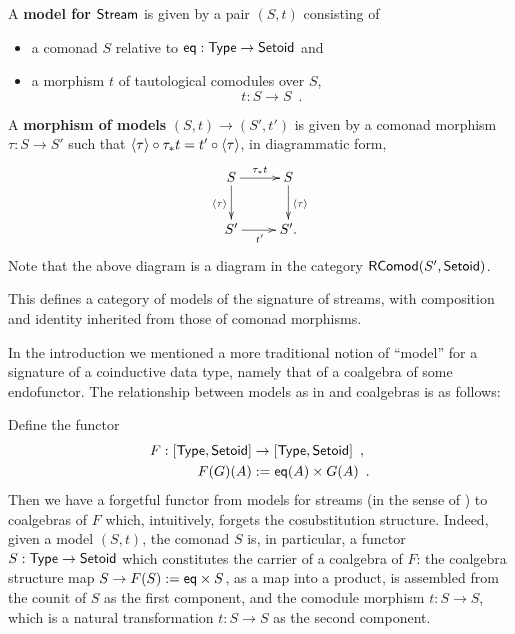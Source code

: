 \documentclass[a4paper,USenglish]{lipics}
\newcommand{\fat}[1]{\textbf{#1}}
\begin{document}
\begin{defn}
 \label{cat_stream}
  A \fat{model for $\mathsf{Stream}$} is given by a pair $(S,t)$ 
  consisting of
  \begin{itemize}
   \item a comonad $S$ relative to $\mathsf{eq} : \mathsf{Type} \to \mathsf{Setoid}$ and
   \item a morphism $t$ of tautological comodules over $S$, 
                   \[t : S \to S \enspace . \]
  \end{itemize}
  A \fat{morphism of models} $(S,t) \to (S',t')$ is given by a comonad morphism $\tau : S \to S'$ such that
     $ {\langle {\tau} \rangle} \circ {\tau_*t} = {t'} \circ {\ensuremath{\langle {\tau} \rangle}}$, in diagrammatic form,
 \[
  \begin{xy}
   \xymatrix{
                  S \ar[r]^{\tau_*t} \ar[d]_{\induced{\tau}} & S \ar[d]^{\induced{\tau}}\\
                  S' \ar[r]_{t'} & S' .
   }
  \end{xy}
 \]
  Note that the above diagram is a diagram in the category $\mathsf{RComod}(S', \mathsf{Setoid})$. 
  
  This defines a category of models of the signature of streams, with composition and identity inherited from those of comonad morphisms.

\end{defn}

In the introduction we mentioned a more traditional notion of \enquote{model} for a signature of a coinductive data type, 
namely that of a coalgebra of some endofunctor. The relationship between models as in  and coalgebras is as follows:

\begin{rem}\label{rem:coalg_stream}
 Define the functor
  \begin{align*}  F: [\mathsf{Type},\mathsf{Setoid}] &\to [\mathsf{Type},\mathsf{Setoid}]  \enspace , \\
                      F(G)(A) &:= \mathsf{eq}(A) \times G(A) \enspace .
  \end{align*}
  Then we have a forgetful functor from models for streams (in the sense of ) to coalgebras of $F$ which, intuitively, forgets the cosubstitution structure.
  Indeed, given a model $(S,t)$, the comonad $S$ is, in particular, a functor $S:\mathsf{Type}\to\mathsf{Setoid}$ which constitutes the carrier of 
  a coalgebra of $F$: the coalgebra structure map $S \to F(S):=\mathsf{eq}\times S$, as a map into a product, 
  is assembled from the counit of $S$ as the first component, and the comodule morphism $t:S\to S$, which
  is a natural transformation $t : S \to S$ as the second component.
\end{rem}
  
\end{document}
